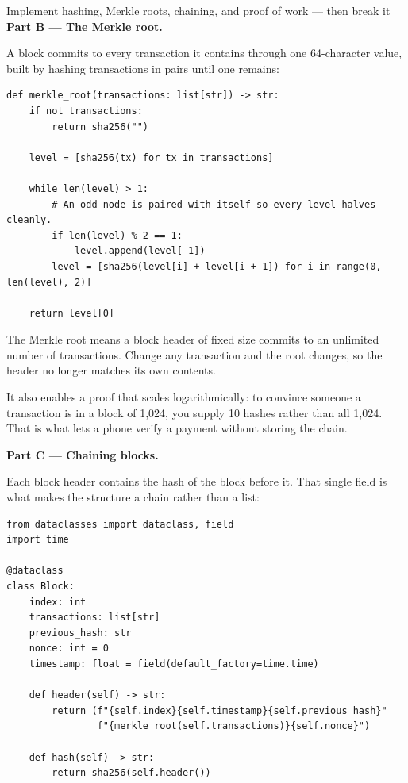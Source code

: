 \begin{labproject}{Implement hashing, Merkle roots, chaining, and proof of work --- then break it}
\medskip\noindent\textbf{Part B --- The Merkle root.}\par
A block commits to every transaction it contains through one 64-character value, built by hashing transactions in pairs until one remains:

\begin{lstlisting}[style=mlpython]
def merkle_root(transactions: list[str]) -> str:
    if not transactions:
        return sha256("")

    level = [sha256(tx) for tx in transactions]

    while len(level) > 1:
        # An odd node is paired with itself so every level halves cleanly.
        if len(level) % 2 == 1:
            level.append(level[-1])
        level = [sha256(level[i] + level[i + 1]) for i in range(0, len(level), 2)]

    return level[0]
\end{lstlisting}

\begin{keyidea}
The Merkle root means a block header of fixed size commits to an unlimited number of transactions. Change any transaction and the root changes, so the header no longer matches its own contents.

It also enables a proof that scales logarithmically: to convince someone a transaction is in a block of 1{,}024, you supply 10 hashes rather than all 1{,}024. That is what lets a phone verify a payment without storing the chain.
\end{keyidea}

\medskip\noindent\textbf{Part C --- Chaining blocks.}\par
Each block header contains the hash of the block before it. That single field is what makes the structure a chain rather than a list:

\begin{lstlisting}[style=mlpython]
from dataclasses import dataclass, field
import time

@dataclass
class Block:
    index: int
    transactions: list[str]
    previous_hash: str
    nonce: int = 0
    timestamp: float = field(default_factory=time.time)

    def header(self) -> str:
        return (f"{self.index}{self.timestamp}{self.previous_hash}"
                f"{merkle_root(self.transactions)}{self.nonce}")

    def hash(self) -> str:
        return sha256(self.header())
\end{lstlisting}


\end{labproject}
